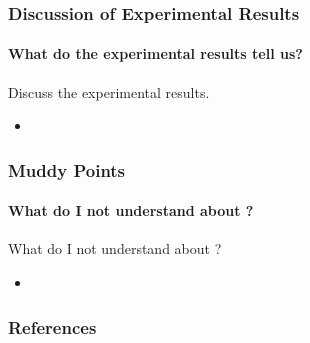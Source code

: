 \documentclass[xcolor={usenames,dvipsnames},hyperref={hyperindex,bookmarks}]{beamer}
\begin{document}
\frame
{
	\frametitle{Discussion of Experimental Results}
	\framesubtitle{What do the experimental results tell us?}

	Discuss the experimental results.
	\begin{itemize}
	\item 
	\end{itemize}

}




\frame
{
	\frametitle{Muddy Points}
	\framesubtitle{What do I not understand about \cite{Hou2018}?}

	What do I not understand about \cite{Hou2018}?
	\begin{itemize}
	\item 
	\end{itemize}

}















\frame
{
	\frametitle{References}



	{\linespread{1}
	
	
	}
}
\end{document}

